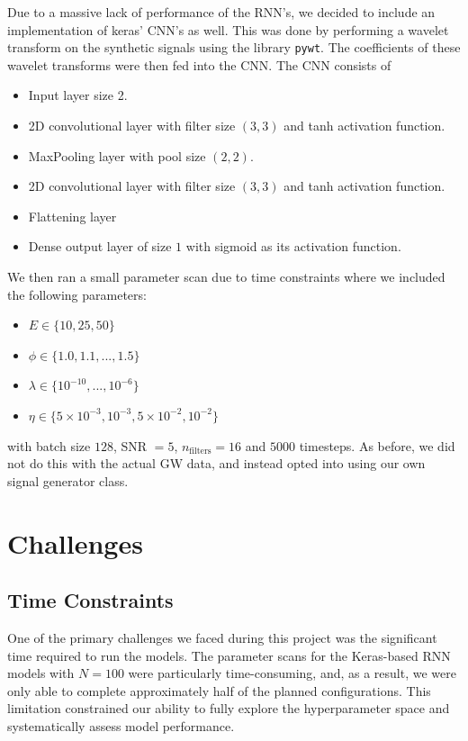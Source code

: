 \documentclass[%
reprint,
amsmath,amssymb,
aps,
]{revtex4-2}
\begin{document}
Due to a massive lack of performance of the RNN's, we decided to include an implementation of keras' CNN's as well. This was done by performing a wavelet transform on the synthetic signals using the library \texttt{pywt}. The coefficients of these wavelet transforms were then fed into the CNN. The CNN consists of 
\begin{itemize}
	\item Input layer size 2.
	\item 2D convolutional layer with filter size $(3,3)$ and tanh activation function.
	\item MaxPooling layer with pool size $(2,2)$.
	\item 2D convolutional layer with filter size $(3,3)$ and tanh activation function.
	\item Flattening layer
	\item Dense output layer of size $1$ with sigmoid as its activation function.
\end{itemize}
We then ran a small parameter scan due to time constraints where we included the following parameters:
\begin{itemize}
	\item $E\in\{10,25,50\}$
	\item $\phi\in\{1.0,1.1,...,1.5\}$
	\item $\lambda\in\{10^{-10},...,10^{-6}\}$
	\item $\eta\in\{5\times10^{-3},10^{-3},5\times10^{-2},10^{-2}\}$
\end{itemize}
with batch size $128$, SNR $=5$, $n_\text{filters}=16$ and $5000$ timesteps. As before, we did not do this with the actual GW data, and instead opted into using our own signal generator class.

\section{Challenges}
\label{sec:challenges}

\subsection{Time Constraints}
One of the primary challenges we faced during this project was the significant time required to run the models. The parameter scans for the Keras-based RNN models with $N=100$ were particularly time-consuming, and, as a result, we were only able to complete approximately half of the planned configurations. This limitation constrained our ability to fully explore the hyperparameter space and systematically assess model performance.
\end{document}
